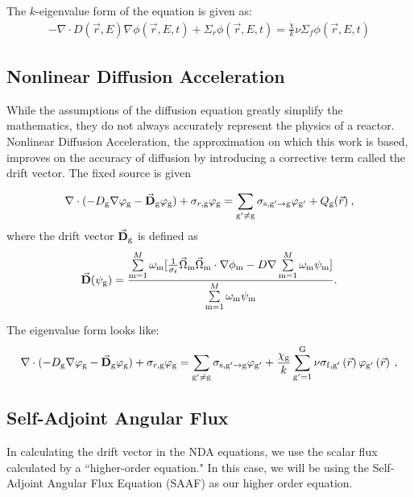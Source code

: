The $k$-eigenvalue form of the equation is given as:
\begin{equation}
    \begin{split}
         - \nabla \cdot D(\vec{r}, E)\nabla\phi(\vec{r}, E, t) + \Sigma_r \phi(\vec{r}, E, t) =  \frac{\chi}{k}\nu\Sigma_f\phi(\vec{r}, E, t) 
    \end{split}
    \label{eq:diffusion_eigenvalue}
\end{equation}

\subsection{Nonlinear Diffusion Acceleration}
While the assumptions of the diffusion equation greatly simplify the mathematics, they do not always accurately represent the physics of a reactor. Nonlinear Diffusion Acceleration, the approximation on which this work is based, improves on the accuracy of diffusion by introducing a corrective term called the drift vector. The fixed source is given 

\begin{equation}
  \nabla\cdot(-D_{\mathrm{g}} \nabla \varphi_{\mathrm{g}} - \vec{\bf D}_{\mathrm{g}} \varphi_{\mathrm{g}}) + \sigma_{r,\mathrm{g}} \varphi_{\mathrm{g}} = \sum\limits_{{\mathrm{g}'}\neq\mathrm{g}}\sigma_{\mathrm{s},\mathrm{g}' \rightarrow \mathrm{g}}\varphi_{\mathrm{g}'} + Q_{\mathrm{g}}(\vec{r}) \:, \label{eq:NDA_fixed_source}
  \end{equation}
  where the drift vector $\vec{\bf D}_{\mathrm{g}}$ is defined as
  \begin{equation}
  \vec{\textbf{D}} (\psi_{\mathrm{g}}) = \frac{\sum\limits_{\mathrm{m}=1}^M \omega_{\mathrm{m}} [\frac{1}{\sigma_t} \vec{\Omega}_{\mathrm{m}} \vec{\Omega}_{\mathrm{m}} \cdot \nabla\phi_{\mathrm{m}} - D \nabla \sum\limits_{\mathrm{m}=1}^M \omega_{\mathrm{m}}\psi_{\mathrm{m}}]}{\sum\limits_{\mathrm{m}=1}^M \omega_{\mathrm{m}} \psi_{\mathrm{m}}}.
  \label{eq:drift_vector}
  \end{equation} 
 
 The eigenvalue form looks like:
 \begin{equation}
  \nabla\cdot(-D_{\mathrm{g}} \nabla \varphi_{\mathrm{g}} - \vec{\bf D}_{\mathrm{g}} \varphi_{\mathrm{g}}) + \sigma_{r,\mathrm{g}} \varphi_{\mathrm{g}} = \sum\limits_{{\mathrm{g}'}\neq\mathrm{g}}\sigma_{\mathrm{s},\mathrm{g}' \rightarrow \mathrm{g}}\varphi_{\mathrm{g}'} +  \frac{\chi_{\mathrm{g}}}{k} \sum\limits_{\mathrm{g}'=1}^{\mathrm{G}} \nu \sigma_{\mathrm{f},\mathrm{g}'}\left(\vec{r}\right) \varphi_{\mathrm{g}'}\left(\vec{r}\right) \:, \label{eq:NDA_eigenvalue}
  \end{equation}

\subsection{Self-Adjoint Angular Flux}
In calculating the drift vector in the NDA equations, we use the scalar flux calculated by a ``higher-order equation." In this case, we will be using the Self-Adjoint Angular Flux Equation (SAAF) \cite{saaf} as our higher order equation. 

